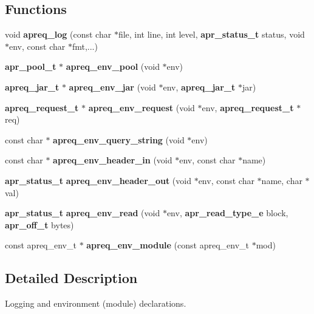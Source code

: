 \subsection*{Functions}
\begin{CompactItemize}
\item 
void {\bf apreq\_\-log} (const char $\ast$file, int line, int level, {\bf apr\_\-status\_\-t} status, void $\ast$env, const char $\ast$fmt,...)\label{apreq__env_8h_a22}

\item 
{\bf apr\_\-pool\_\-t} $\ast$ {\bf apreq\_\-env\_\-pool} (void $\ast$env)\label{apreq__env_8h_a23}

\item 
{\bf apreq\_\-jar\_\-t} $\ast$ {\bf apreq\_\-env\_\-jar} (void $\ast$env, {\bf apreq\_\-jar\_\-t} $\ast$jar)\label{apreq__env_8h_a24}

\item 
{\bf apreq\_\-request\_\-t} $\ast$ {\bf apreq\_\-env\_\-request} (void $\ast$env, {\bf apreq\_\-request\_\-t} $\ast$req)\label{apreq__env_8h_a25}

\item 
const char $\ast$ {\bf apreq\_\-env\_\-query\_\-string} (void $\ast$env)\label{apreq__env_8h_a26}

\item 
const char $\ast$ {\bf apreq\_\-env\_\-header\_\-in} (void $\ast$env, const char $\ast$name)\label{apreq__env_8h_a27}

\item 
{\bf apr\_\-status\_\-t} {\bf apreq\_\-env\_\-header\_\-out} (void $\ast$env, const char $\ast$name, char $\ast$val)\label{apreq__env_8h_a28}

\item 
{\bf apr\_\-status\_\-t} {\bf apreq\_\-env\_\-read} (void $\ast$env, {\bf apr\_\-read\_\-type\_\-e} block, {\bf apr\_\-off\_\-t} bytes)\label{apreq__env_8h_a29}

\item 
const apreq\_\-env\_\-t $\ast$ {\bf apreq\_\-env\_\-module} (const apreq\_\-env\_\-t $\ast$mod)\label{apreq__env_8h_a30}

\end{CompactItemize}


\subsection{Detailed Description}
Logging and environment (module) declarations.

